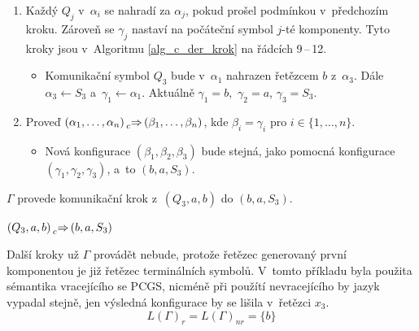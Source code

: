 \begin{example}
\begin{enumerate}
\begin{itemize}[label=$\circ$]
        \end{itemize}
        \item Každý $Q_j$ v~$\alpha_i$ se nahradí za $\alpha_j$, pokud prošel podmínkou v~předchozím kroku.
        Zároveň se $\gamma_j$ nastaví na počáteční symbol $j$-té komponenty.
        Tyto kroky jsou v~Algoritmu \ref{alg_c_der_krok} na řádcích 9\,--\,12.
        \begin{itemize}[label=$\circ$]
            \item Komunikační symbol $Q_3$ bude v~$\alpha_1$ nahrazen řetězcem $b$ z~$\alpha_3$. Dále $\alpha_3 \gets S_3$ a~$\gamma_1 \gets \alpha_1$.
            Aktuálně $\gamma_1 = b,$ $\gamma_2 = a$, $\gamma_3 = S_3$. 
        \end{itemize}
        \item Proveď $(\alpha_1, \ldots, \alpha_n) \prescript{}{c}{\Rightarrow}\, (\beta_1, \ldots, \beta_n)$, kde $\beta_i = \gamma_i$ pro $i \in \{1, \ldots, n\}$.
        \begin{itemize}[label=$\circ$]
            \item Nová konfigurace $(\beta_1, \beta_2, \beta_3)$ bude stejná, jako pomocná konfigurace $(\gamma_1, \gamma_2, \gamma_3)$, a~to $(b, a, S_3)$.
        \end{itemize}
    \end{enumerate}
    $\Gamma$ provede komunikační krok z~$(Q_3, a, b)$ do $(b, a, S_3)$.
    \begin{center}
        $(Q_3, a, b) \prescript{}{c}{\Rightarrow}\, (b, a, S_3)$
    \end{center}
    Další kroky už $\Gamma$ provádět nebude, protože řetězec generovaný první komponentou je již řetězec terminálních symbolů.
    V~tomto příkladu byla použita sémantika vracejícího se PCGS, nicméně při použítí nevracejícího by jazyk vypadal stejně, jen výsledná konfigurace by se lišila v~řetězci $x_3$.
    \begin{equation*}
        L(\Gamma)_r = L(\Gamma)_{nr} = \{b\}
    \end{equation*}
\end{example}

